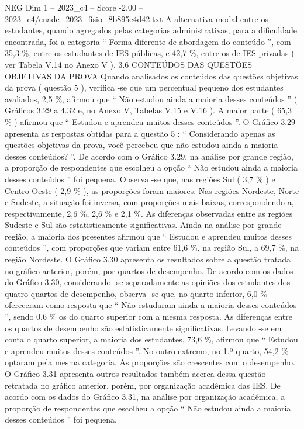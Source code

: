 \begin{textsample}{NEG Dim 1 – 2023\_c4 – Score -2.00 – 2023\_c4/enade\_2023\_fisio\_8b895e4d42.txt}
A alternativa modal entre os estudantes, quando agregados pelas categorias administrativas, para a dificuldade encontrada, foi a categoria “ Forma diferente de abordagem do conteúdo ”, com 35,3 \%, entre os estudantes de IES públicas, e 42,7 \%, entre os de IES privadas ( ver Tabela V.14 no Anexo V ). 3.6 CONTEÚDOS DAS QUESTÕES OBJETIVAS DA PROVA Quando analisados os conteúdos das questões objetivas da prova ( questão 5 ), verifica -se que um percentual pequeno dos estudantes avaliados, 2,5 \%, afirmou que “ Não estudou ainda a maioria desses conteúdos ” ( Gráficos 3.29 a 4.32 e, no Anexo V, Tabelas V.15 e V.16 ).
A maior parte ( 65,3 \% ) afirmou que “ Estudou e aprendeu muitos desses conteúdos ”.
O Gráfico 3.29 apresenta as respostas obtidas para a questão 5 : “ Considerando apenas as questões objetivas da prova, você percebeu que não estudou ainda a maioria desses conteúdos? ”.
De acordo com o Gráfico 3.29, na análise por grande região, a proporção de respondentes que escolheu a opção “ Não estudou ainda a maioria desses conteúdos ” foi pequena.
Observa -se que, nas regiões Sul ( 3,7 \% ) e Centro-Oeste ( 2,9 \% ), as proporções foram maiores.
Nas regiões Nordeste, Norte e Sudeste, a situação foi inversa, com proporções mais baixas, correspondendo a, respectivamente, 2,6 \%, 2,6 \% e 2,1 \%.
As diferenças observadas entre as regiões Sudeste e Sul são estatisticamente significativas.
Ainda na análise por grande região, a maioria dos presentes afirmou que “ Estudou e aprendeu muitos desses conteúdos ”, com proporções que variam entre 61,6 \%, na região Sul, a 69,7 \%, na região Nordeste.
O Gráfico 3.30 apresenta os resultados sobre a questão tratada no gráfico anterior, porém, por quartos de desempenho.
De acordo com os dados do Gráfico 3.30, considerando -se separadamente as opiniões dos estudantes dos quatro quartos de desempenho, observa -se que, no quarto inferior, 6,0 \% ofereceram como resposta que “ Não estudaram ainda a maioria desses conteúdos ”, sendo 0,6 \% os do quarto superior com a mesma resposta.
As diferenças entre os quartos de desempenho são estatisticamente significativas.
Levando -se em conta o quarto superior, a maioria dos estudantes, 73,6 \%, afirmou que “ Estudou e aprendeu muitos desses conteúdos ”.
No outro extremo, no 1.º quarto, 54,2 \% optaram pela mesma categoria.
As proporções são crescentes com o desempenho.
O Gráfico 3.31 apresenta outros resultados também acerca dessa questão retratada no gráfico anterior, porém, por organização acadêmica das IES.
De acordo com os dados do Gráfico 3.31, na análise por organização acadêmica, a proporção de respondentes que escolheu a opção “ Não estudou ainda a maioria desses conteúdos ” foi pequena.

\end{textsample}
